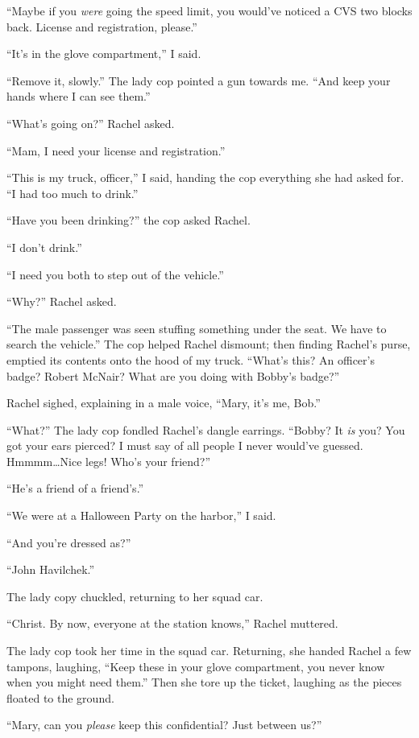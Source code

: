 ``Maybe if you \emph{were} going the speed limit, you would've noticed a
CVS two blocks back. License and registration, please.''

``It's in the glove compartment,'' I said.

``Remove it, slowly.'' The lady cop pointed a gun towards me. ``And keep
your hands where I can see them.''

``What's going on?'' Rachel asked.

``Mam, I need your license and registration.''

``This is my truck, officer,'' I said, handing the cop everything she
had asked for. ``I had too much to drink.''

``Have you been drinking?'' the cop asked Rachel.

``I don't drink.''

``I need you both to step out of the vehicle.''

``Why?'' Rachel asked.

``The male passenger was seen stuffing something under the seat. We have
to search the vehicle.'' The cop helped Rachel dismount; then finding
Rachel's purse, emptied its contents onto the hood of my truck. ``What's
this? An officer's badge? Robert McNair? What are you doing with Bobby's
badge?''

Rachel sighed, explaining in a male voice, ``Mary, it's me, Bob.''

``What?'' The lady cop fondled Rachel's dangle earrings. ``Bobby? It
\emph{is} you? You got your ears pierced? I must say of all people I
never would've guessed. Hmmmm\ldots Nice legs! Who's your friend?''

``He's a friend of a friend's.''

``We were at a Halloween Party on the harbor,'' I said.

``And you're dressed as?''

``John Havilchek.''

The lady copy chuckled, returning to her squad car.

``Christ. By now, everyone at the station knows,'' Rachel muttered.

The lady cop took her time in the squad car. Returning, she handed
Rachel a few tampons, laughing, ``Keep these in your glove compartment,
you never know when you might need them.'' Then she tore up the ticket,
laughing as the pieces floated to the ground.

``Mary, can you \emph{please} keep this confidential? Just between us?''

